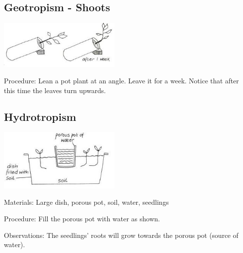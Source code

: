 \begin{multicols}{2}
\columnbreak

\subsection{Geotropism - Shoots}

\begin{center}
\includegraphics[width=0.45\textwidth]{./img/vso/geotropism-shoots.jpg}
\end{center}

\begin{description*}
\item[Procedure:]{Lean a pot plant at an angle.
Leave it for a week. Notice that
after this time the leaves turn
upwards.}
\end{description*}

\subsection{Hydrotropism}

\begin{center}
\includegraphics[width=0.45\textwidth]{./img/vso/hydrotropism.jpg}
\end{center}

\begin{description*}
\item[Materials:]{Large dish, porous pot, soil, water, seedlings}
\item[Procedure:]{Fill the porous pot with water as shown.}
\item[Observations:]{The seedlings' roots will grow
towards the porous pot (source of water).}
\end{description*}


\end{multicols}
